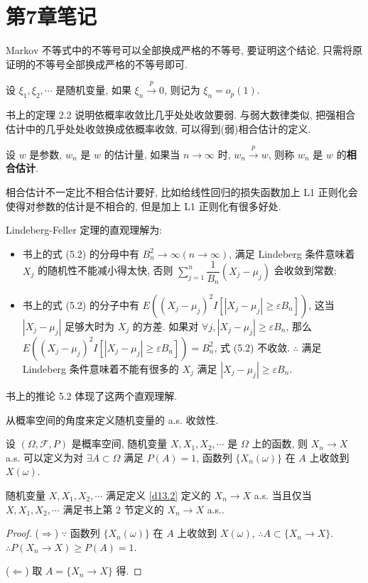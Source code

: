 \documentclass{ctexart}
\begin{document}
\section{第7章笔记}
Markov 不等式中的不等号可以全部换成严格的不等号, 要证明这个结论, 只需将原证明的不等号全部换成严格的不等号即可.

设 $\xi_1,\xi_2,\cdots$ 是随机变量, 如果 $\xi_n\xrightarrow{p}0$, 则记为 $\xi_n=o_p(1)$.

书上的定理 2.2 说明依概率收敛比几乎处处收敛要弱. 与弱大数律类似, 把强相合估计中的几乎处处收敛换成依概率收敛, 可以得到(弱)相合估计的定义.
\begin{definition}
    设 $w$ 是参数, $w_n$ 是 $w$ 的估计量, 如果当 $n\to\infty$ 时, $w_n\xrightarrow{p}w$, 则称 $w_n$ 是 $w$ 的\textbf{相合估计}.
\end{definition}

相合估计不一定比不相合估计要好, 比如给线性回归的损失函数加上 L1 正则化会使得对参数的估计是不相合的, 但是加上 L1 正则化有很多好处.

Lindeberg-Feller 定理的直观理解为:
\begin{itemize}
    \item 书上的式 (5.2) 的分母中有 $B_n^2\to\infty(n\to\infty)$, 满足 Lindeberg 条件意味着 $X_j$ 的随机性不能减小得太快, 否则 $\sum\limits_{j=1}^n\dfrac{1}{B_n}(X_j-\mu_j)$ 会收敛到常数;
    \item 书上的式 (5.2) 的分子中有 $E((X_j-\mu_j)^2I[|X_j-\mu_j|\geq\varepsilon B_n])$, 这当 $|X_j-\mu_j|$ 足够大时为 $X_j$ 的方差. 如果对 $\forall j,|X_j-\mu_j|\geq\varepsilon B_n$, 那么 $E((X_j-\mu_j)^2I[|X_j-\mu_j|\geq\varepsilon B_n])=B_n^2$, 式 (5.2) 不收敛. $\therefore$ 满足 Lindeberg 条件意味着不能有很多的 $X_j$ 满足 $|X_j-\mu_j|\geq\varepsilon B_n$.
\end{itemize}

书上的推论 5.2 体现了这两个直观理解.

从概率空间的角度来定义随机变量的 a.s. 收敛性.
\begin{definition}\label{d13.2}
    设 $(\Omega,\mathcal{F},P)$ 是概率空间, 随机变量 $X,X_1,X_2,\cdots$ 是 $\Omega$ 上的函数, 则 $X_n\to X$ a.s. 可以定义为对 $\exists A\subset\Omega$ 满足 $P(A)=1$, 函数列 $\{X_n(\omega)\}$ 在 $A$ 上收敛到 $X(\omega)$.
\end{definition}
\begin{theorem}
    随机变量 $X,X_1,X_2,\cdots$ 满足定义 \ref{d13.2} 定义的 $X_n\to X$ a.s. 当且仅当 $X,X_1,X_2,\cdots$ 满足书上第 2 节定义的 $X_n\to X$ a.s..
\end{theorem}
\begin{proof}
    ($\Rightarrow$) $\because$ 函数列 $\{X_n(\omega)\}$ 在 $A$ 上收敛到 $X(\omega)$, $\therefore A\subset\{X_n\to X\}$. $\therefore P(X_n\to X)\geq P(A)=1$.

    ($\Leftarrow$) 取 $A=\{X_n\to X\}$ 得.
\end{proof}
\end{document}
